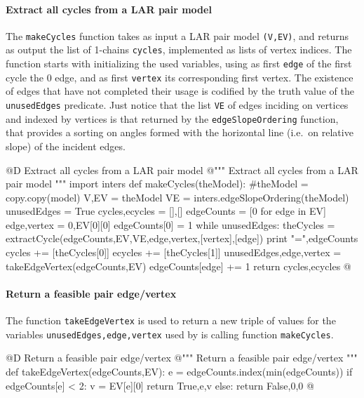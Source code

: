 \documentclass[11pt,oneside]{article}	%
\begin{document}
\paragraph{Extract all cycles from a LAR pair model}

The \texttt{makeCycles} function takes as input a LAR pair model \texttt{(V,EV)}, and returns as output the list of 1-chains \texttt{cycles}, implemented as lists of vertex indices. The function starts with initializing the used variables, using as first \texttt{edge} of the first cycle the 0 edge, and as first \texttt{vertex} its corresponding first vertex. The existence of edges that have not completed their usage is codified by the truth value of the \texttt{unusedEdges} predicate. Just notice that the list \texttt{VE} of edges inciding on vertices and indexed by vertices is that returned by the \texttt{edgeSlopeOrdering} function, that provides a sorting on angles formed with the horizontal line (i.e.~on relative slope) of the incident edges. 

@D Extract all cycles from a LAR pair model
@{""" Extract all cycles from a LAR pair model """ 
import inters
def makeCycles(theModel):
    #theModel = copy.copy(model)
    V,EV = theModel
    VE = inters.edgeSlopeOrdering(theModel)
    unusedEdges = True
    cycles,ecycles = [],[]
    edgeCounts = [0 for edge in EV]
    edge,vertex = 0,EV[0][0]
    edgeCounts[0] = 1
    while unusedEdges:
        theCycles = extractCycle(edgeCounts,EV,VE,edge,vertex,[vertex],[edge])
        print "\nedgeCounts =",edgeCounts
        cycles += [theCycles[0]]
        ecycles += [theCycles[1]]
        unusedEdges,edge,vertex = takeEdgeVertex(edgeCounts,EV)
        edgeCounts[edge] += 1
    return cycles,ecycles
@}


\paragraph{Return a feasible pair edge/vertex}
The function \texttt{takeEdgeVertex} is used to return a new triple of values for the variables \texttt{unusedEdges,edge,vertex} used by is calling function \texttt{makeCycles}.

@D Return a feasible pair edge/vertex
@{""" Return a feasible pair edge/vertex """ 
def takeEdgeVertex(edgeCounts,EV):
    e = edgeCounts.index(min(edgeCounts))
    if edgeCounts[e] < 2: 
        v = EV[e][0]
        return True,e,v
    else: return False,0,0
@}
\end{document}
